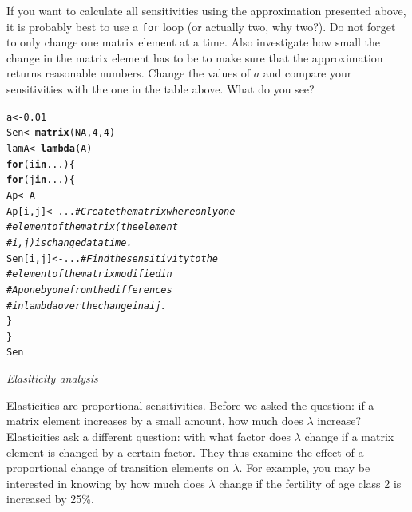 \documentclass{article}\usepackage[]{graphicx}\usepackage[]{color}
\makeatletter
\newcommand{\hlnum}[1]{\textcolor[rgb]{0.686,0.059,0.569}{#1}}%
\newcommand{\hlcom}[1]{\textcolor[rgb]{0.678,0.584,0.686}{\textit{#1}}}%
\newcommand{\hlstd}[1]{\textcolor[rgb]{0.345,0.345,0.345}{#1}}%
\newcommand{\hlkwa}[1]{\textcolor[rgb]{0.161,0.373,0.58}{\textbf{#1}}}%
\newcommand{\hlkwb}[1]{\textcolor[rgb]{0.69,0.353,0.396}{#1}}%
\newcommand{\hlkwd}[1]{\textcolor[rgb]{0.737,0.353,0.396}{\textbf{#1}}}%
\newenvironment{kframe}{%
 \def\at@end@of@kframe{}%
 \ifinner\ifhmode%
  \def\at@end@of@kframe{\end{minipage}}%
  \begin{minipage}{\columnwidth}%
 \fi\fi%
 \def\FrameCommand##1{\hskip\@totalleftmargin \hskip-\fboxsep
 \colorbox{shadecolor}{##1}\hskip-\fboxsep
     \hskip-\linewidth \hskip-\@totalleftmargin \hskip\columnwidth}%
 \MakeFramed {\advance\hsize-\width
   \@totalleftmargin\z@ \linewidth\hsize
   \@setminipage}}%
 {\par\unskip\endMakeFramed%
 \at@end@of@kframe}
\newenvironment{knitrout}{}{} %
\makeatother
\begin{document}
\begin{mdframed}
If you want to calculate all sensitivities using the approximation presented above, it is probably best to use a \texttt{for} loop (or actually two, why two?). Do not forget to only change one matrix element at a time. Also investigate how small the change in the matrix element has to be to make sure that the approximation returns reasonable numbers. Change the values of $a$ and compare your sensitivities with the one in the table above. What do you see?

\begin{knitrout}
\color{fgcolor}\begin{kframe}
\begin{alltt}
\hlstd{a}\hlkwb{<-}\hlnum{0.01}
\hlstd{Sen}\hlkwb{<-}\hlkwd{matrix}\hlstd{(}\hlnum{NA}\hlstd{,}\hlnum{4}\hlstd{,}\hlnum{4}\hlstd{)}
\hlstd{lamA}\hlkwb{<-}\hlkwd{lambda}\hlstd{(A)}
\hlkwa{for} \hlstd{(i} \hlkwa{in} \hlstd{...)\{}
  \hlkwa{for} \hlstd{(j} \hlkwa{in} \hlstd{...)\{}
  \hlstd{Ap}\hlkwb{<-}\hlstd{A}
  \hlstd{Ap[i,j]}\hlkwb{<-}\hlstd{...} \hlcom{# Create the matrix where only one }
               \hlcom{# element of the matrix (the element}
               \hlcom{#i,j) is changed at a time.}
  \hlstd{Sen[i,j]}\hlkwb{<-}\hlstd{...} \hlcom{# Find the sensitivity to the }
               \hlcom{# element of the matrix modified in }
               \hlcom{# Ap one by one from the differences}
               \hlcom{# in lambda over the change in aij. }
\hlstd{\}}
\hlstd{\}}
\hlstd{Sen}
\end{alltt}
\end{kframe}
\end{knitrout}
\end{mdframed}

\vspace{1.5ex}

\noindent\textit{Elasiticity analysis}


Elasticities are proportional sensitivities. Before we asked the question: if a matrix element increases by a small amount, how much does $\lambda$ \; increase? Elasticities ask a different question: with what factor does $\lambda$\; change if a matrix element is changed by a certain factor. They thus examine the effect of a proportional change of transition elements on $\lambda$. For example, you may be interested in knowing by how much does $\lambda$\; change if the fertility of age class 2 is increased by 25\%. 
 
\end{document}

